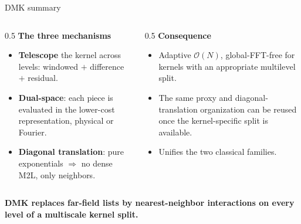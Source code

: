 \documentclass[aspectratio=169,11pt]{beamer}
\newcommand{\cO}{\mathcal{O}}
\newcommand{\hl}[1]{{\color{CCMorange}\textbf{#1}}}
\begin{document}
\begin{frame}{DMK summary}
\small
\begin{columns}[T,totalwidth=\textwidth]
\begin{column}{0.5\textwidth}
\textbf{The three mechanisms}
\begin{itemize}
  \item \hl{Telescope} the kernel across levels: windowed \(+\) difference \(+\) residual.
  \item \hl{Dual-space}: each piece is evaluated in the lower-cost representation,
  physical or Fourier.
  \item \hl{Diagonal translation}: pure exponentials \(\Rightarrow\) no dense M2L, only neighbors.
\end{itemize}
\end{column}
\begin{column}{0.5\textwidth}
\textbf{Consequence}
\begin{itemize}
  \item Adaptive \(\cO(N)\), global-FFT-free for kernels with an appropriate multilevel split.
  \item The same proxy and diagonal-translation organization can be reused once the kernel-specific split is available.
  \item Unifies the two classical families.
\end{itemize}
\end{column}
\end{columns}
\vspace{5mm}
\begin{center}
\hl{DMK replaces far-field lists by nearest-neighbor interactions on every level
of a multiscale kernel split.}
\end{center}
\end{frame}
\end{document}
